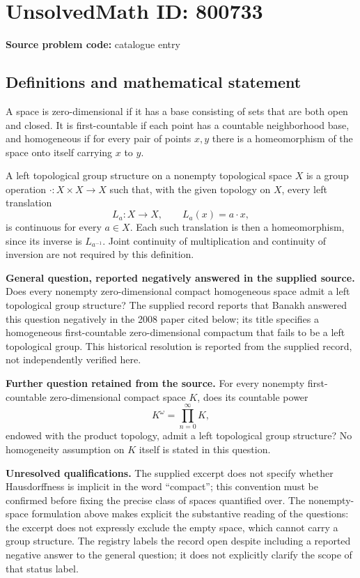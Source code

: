 \documentclass[11pt]{article}
\begin{document}
\section*{UnsolvedMath ID: 800733}
\textbf{Source problem code:} catalogue entry
\subsection{Definitions and mathematical statement}
A space is zero-dimensional if it has a base consisting of sets that are both open and closed. It is first-countable if each point has a countable neighborhood base, and homogeneous if for every pair of points \(x,y\) there is a homeomorphism of the space onto itself carrying \(x\) to \(y\).

A left topological group structure on a nonempty topological space \(X\) is a group operation \(\cdot\colon X\times X\to X\) such that, with the given topology on \(X\), every left translation
\[
L_a\colon X\longrightarrow X,\qquad L_a(x)=a\cdot x,
\]
is continuous for every \(a\in X\). Each such translation is then a homeomorphism, since its inverse is \(L_{a^{-1}}\). Joint continuity of multiplication and continuity of inversion are not required by this definition.

\textbf{General question, reported negatively answered in the supplied source.} Does every nonempty zero-dimensional compact homogeneous space admit a left topological group structure? The supplied record reports that Banakh answered this question negatively in the 2008 paper cited below; its title specifies a homogeneous first-countable zero-dimensional compactum that fails to be a left topological group. This historical resolution is reported from the supplied record, not independently verified here.

\textbf{Further question retained from the source.} For every nonempty first-countable zero-dimensional compact space \(K\), does its countable power
\[
K^{\omega}=\prod_{n=0}^{\infty}K,
\]
endowed with the product topology, admit a left topological group structure? No homogeneity assumption on \(K\) itself is stated in this question.

\textbf{Unresolved qualifications.} The supplied excerpt does not specify whether Hausdorffness is implicit in the word ``compact''; this convention must be confirmed before fixing the precise class of spaces quantified over. The nonempty-space formulation above makes explicit the substantive reading of the questions: the excerpt does not expressly exclude the empty space, which cannot carry a group structure. The registry labels the record open despite including a reported negative answer to the general question; it does not explicitly clarify the scope of that status label.
\end{document}
